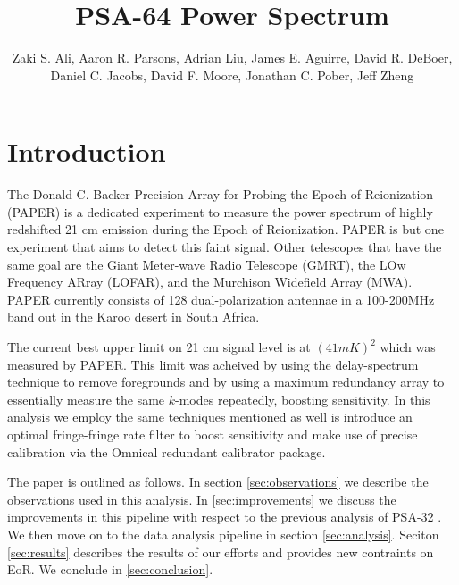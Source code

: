 \documentclass[twocolumn,numberedappendix]{emulateapj}
\begin{document}
\title{PSA-64 Power Spectrum}

\author{
Zaki S. Ali,
Aaron R. Parsons,
Adrian Liu,
James E. Aguirre,
David R. DeBoer,
Daniel C. Jacobs,
David F. Moore,
Jonathan C. Pober,
Jeff Zheng
}


\begin{abstract}
\end{abstract}


\section{Introduction}
The Donald C. Backer Precision Array for Probing the Epoch of Reionization
(PAPER) is a dedicated experiment to measure the power spectrum of highly
redshifted 21 cm emission during the Epoch of Reionization. PAPER is but one
experiment that aims to detect this faint signal. Other telescopes that have the
same goal are the Giant Meter-wave Radio Telescope (GMRT), the LOw Frequency
ARray (LOFAR), and the Murchison Widefield Array (MWA). PAPER currently consists
of 128 dual-polarization antennae in a 100-200MHz band out in the Karoo desert
in South Africa. 

The current best upper limit on 21 cm signal level is at $(41 mK)^{2}$ which was
measured by PAPER. This limit was acheived by using the delay-spectrum technique
to remove foregrounds and by using a maximum redundancy array to essentially
measure the same $k$-modes repeatedly, boosting sensitivity. In this analysis we
employ the same techniques mentioned as well is introduce an optimal fringe-fringe
rate filter to  boost sensitivity and make use of precise calibration via
the Omnical redundant calibrator package. 

The paper is outlined as follows. In section \ref{sec:observations} we describe
the observations used in this analysis. In \ref{sec:improvements} we discuss the
improvements in this pipeline with respect to the previous analysis of PSA-32
\cite{parsons_et_al2014}. We then move on to the data analysis pipeline in
section \ref{sec:analysis}. Seciton \ref{sec:results} describes the results of
 our efforts and provides new contraints on EoR. We conclude in
\ref{sec:conclusion}.
\end{document}

